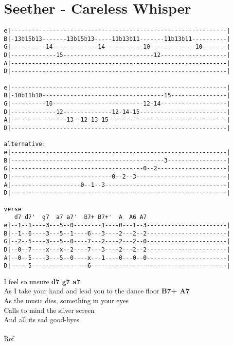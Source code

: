 \section{Seether - Careless Whisper}
\begin{verbatim}
e|--------------------------------------------------------------|
B|-13b15b13-------13b15b13-----11b13b11-------11b13b11----------|
G|----------14-------------14-----------10-------------10-------|
D|-------------15--------------------------12-------------------|
A|--------------------------------------------------------------|
D|--------------------------------------------------------------|

e|--------------------------------------------------------------|
B|-10b11b10-----------------------------------15----------------|
G|----------10--------------------------12-14-------------------|
D|-------------12--------------12-14-15-------------------------|
A|----------------13--12-13-15----------------------------------|
D|--------------------------------------------------------------|

alternative:
e|--------------------------------------------------------------|
B|--------------------------------------------3-----------------|
G|--------------------------------------0--2--------------------|
D|-----------------------------0--2--3--------------------------|
A|--------------------0--1--3-----------------------------------|
D|--------------------------------------------------------------|

verse
   d7 d7'  g7  a7 a7'  B7+ B7+'  A  A6 A7
e|--1--1----3---5--0--------1----0---1--3-----------------------|
B|--1--6----3---5--1----6---3----2---2--2-----------------------|
G|--2--5----3---5--0----7---2----2---2--0-----------------------|
D|--0--7----x---x--2----7---3----2---2--2-----------------------|
A|--0--5----3---5--0----x---1----0---0--0-----------------------|
D|-----5----------------6---------------------------------------|

\end{verbatim}
I feel so unsure \textbf{d7 g7 a7}\\
As I take your hand and lead you to the dance floor \textbf{B7+ A7}\\
As the music dies, something in your eyes\\
Calls to mind the silver screen\\
And all its sad good-byes\\
\\
Ref\\
